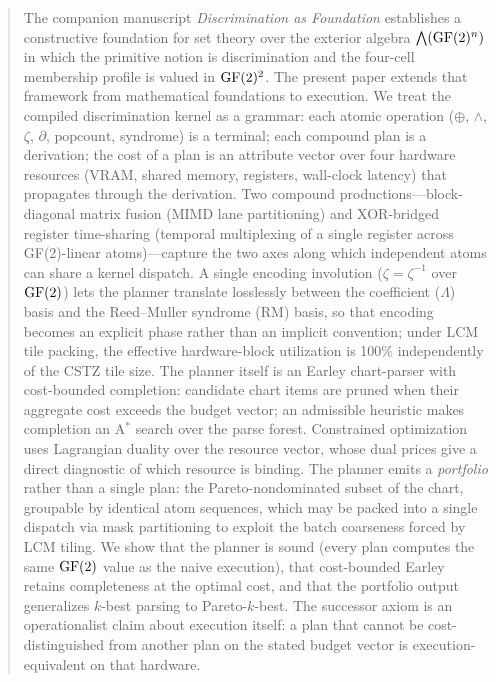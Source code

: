 \begin{abstract}
The companion manuscript \emph{Discrimination as Foundation} establishes
a constructive foundation for set theory over the exterior algebra
$\bigwedge(\GF(2)^n)$ in which the primitive notion is discrimination
and the four-cell membership profile is valued in $\GF(2)^2$. The
present paper extends that framework from mathematical foundations to
execution. We treat the compiled discrimination kernel as a grammar:
each atomic operation ($\oplus$, $\wedge$, $\zeta$, $\partial$,
$\mathrm{popcount}$, syndrome) is a terminal; each compound plan is
a derivation; the cost of a plan is an attribute vector over four
hardware resources (VRAM, shared memory, registers, wall-clock
latency) that propagates through the derivation. Two compound
productions---block-diagonal matrix fusion (MIMD lane partitioning)
and XOR-bridged register time-sharing (temporal multiplexing of a
single register across GF(2)-linear atoms)---capture the two axes
along which independent atoms can share a kernel dispatch. A single
encoding involution ($\zeta = \zeta^{-1}$ over $\GF(2)$) lets the
planner translate losslessly between the coefficient ($\Lambda$)
basis and the Reed--Muller syndrome (RM) basis, so that encoding
becomes an explicit phase rather than an implicit convention; under
LCM tile packing, the effective hardware-block utilization is 100\%
independently of the CSTZ tile size. The planner itself is an Earley
chart-parser with cost-bounded completion: candidate chart items are
pruned when their aggregate cost exceeds the budget vector; an
admissible heuristic makes completion an A$^*$ search over the
parse forest. Constrained optimization uses Lagrangian duality over
the resource vector, whose dual prices give a direct diagnostic of
which resource is binding. The planner emits a \emph{portfolio}
rather than a single plan: the Pareto-nondominated subset of the
chart, groupable by identical atom sequences, which may be packed
into a single dispatch via mask partitioning to exploit the batch
coarseness forced by LCM tiling. We show that the planner is sound
(every plan computes the same $\GF(2)$ value as the naive execution),
that cost-bounded Earley retains completeness at the optimal cost,
and that the portfolio output generalizes $k$-best parsing to
Pareto-$k$-best. The successor axiom is an operationalist claim
about execution itself: a plan that cannot be cost-distinguished
from another plan on the stated budget vector is execution-equivalent
on that hardware.
\end{abstract}
